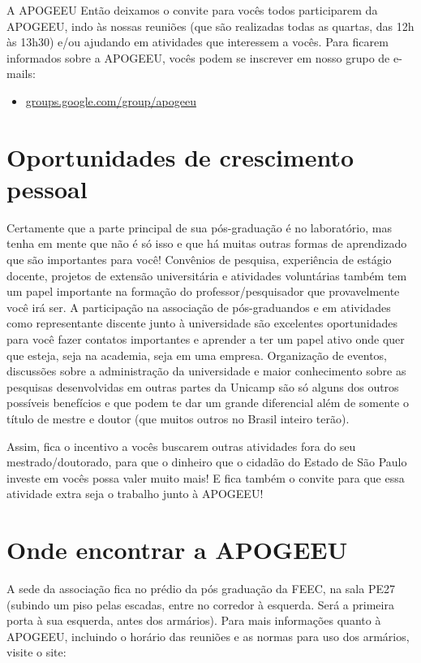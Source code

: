 \begin{story}{A APOGEEU}
Então deixamos o convite para vocês todos participarem da APOGEEU, indo às nossas reuniões (que são realizadas todas as quartas, das 12h às 13h30) e/ou ajudando em atividades que interessem a vocês. Para ficarem informados sobre a APOGEEU, vocês podem se inscrever em nosso grupo de e-mails:

\begin{itemize}
\item \url{groups.google.com/group/apogeeu}
\end{itemize}

\section*{Oportunidades de crescimento pessoal}

Certamente que a parte principal de sua pós-graduação é no laboratório, mas tenha em mente que não é só isso e que há muitas outras formas de aprendizado que são importantes para você! Convênios de pesquisa, experiência de estágio docente, projetos de extensão universitária e atividades voluntárias também tem um papel importante na formação do professor/pesquisador que provavelmente você irá ser. A participação na associação de pós-graduandos e em atividades como representante discente junto à universidade são excelentes oportunidades para você fazer contatos importantes e aprender a ter um papel ativo onde quer que esteja, seja na academia, seja em uma empresa. Organização de eventos, discussões sobre a administração da universidade e maior conhecimento sobre as pesquisas desenvolvidas em outras partes da Unicamp são só alguns dos outros possíveis benefícios e que podem te dar um grande diferencial além de somente o título de mestre e doutor (que muitos outros no Brasil inteiro terão).

Assim, fica o incentivo a vocês buscarem outras atividades fora do seu mestrado/doutorado, para que o dinheiro que o cidadão do Estado de São Paulo investe em vocês possa valer muito mais! E fica também o convite para que essa atividade extra seja o trabalho junto à APOGEEU!

\section*{Onde encontrar a APOGEEU}

A sede da associação fica no prédio da pós graduação da FEEC, na sala PE27 (subindo um piso pelas escadas, entre no corredor à esquerda. Será a primeira porta à sua esquerda, antes dos armários). Para mais informações quanto à APOGEEU, incluindo o horário das reuniões e as normas para uso dos armários, visite o site:


\end{story}
